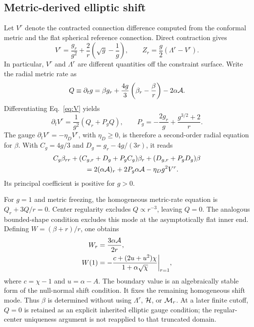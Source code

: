 \subsection{Metric-derived elliptic shift}
Let $V^r$ denote the contracted connection difference computed from the conformal metric and the flat spherical reference connection. Direct contraction gives
\begin{equation}
 V^r=\frac{g_r}{g^2}+\frac{2}{r}\left(\sqrt g-\frac1g\right),
 \qquad Z_r=\frac g2(\Lambda^r-V^r).
\label{eq:V}
\end{equation}
In particular, $V^r$ and $\Lambda^r$ are different quantities off the constraint surface. Write the radial metric rate as
\begin{equation}
 Q\equiv\partial_tg=\beta g_r+\frac{4g}{3}
 \left(\beta_r-\frac\beta r\right)-2\alpha\mathcal A.
\end{equation}
Differentiating Eq.~\eqref{eq:V} yields
\begin{equation}
 \partial_tV^r=\frac{1}{g^2}(Q_r+P_g Q),\qquad
 P_g=-\frac{2g_r}{g}+\frac{g^{3/2}+2}{r}.
\end{equation}
The gauge $\partial_tV^r=-\eta_D V^r$, with $\eta_D\geq0$, is therefore a second-order radial equation for $\beta$. With $C_g=4g/3$ and $D_g=g_r-4g/(3r)$, it reads
\begin{align}
 C_g\beta_{rr}+(C_{g,r}+D_g+P_gC_g)\beta_r
 &+(D_{g,r}+P_gD_g)\beta \nonumber\\
 =2(\alpha\mathcal A)_r+2P_g\alpha\mathcal A&-\eta_Dg^2V^r.
\label{eq:elliptic}
\end{align}
Its principal coefficient is positive for $g>0$.

For $g=1$ and metric freezing, the homogeneous metric-rate equation is $Q_r+3Q/r=0$. Center regularity excludes $Q\propto r^{-3}$, leaving $Q=0$. The analogous bounded-shape condition excludes this mode at the asymptotically flat inner end. Defining $W=(\beta+r)/r$, one obtains
\begin{align}
 W_r&=\frac{3\alpha\mathcal A}{2r},\label{eq:W}\\
 W(1)&=-\frac{c+(2u+u^2)\chi}{1+\alpha\sqrt\chi}\bigg|_{r=1},\nonumber
\end{align}
where $c=\chi-1$ and $u=\alpha-A$.
The boundary value is an algebraically stable form of the null-normal shift condition. It fixes the remaining homogeneous shift mode. Thus $\beta$ is determined without using $\Lambda^r$, $\mathcal H$, or $\mathcal M_r$. At a later finite cutoff, $Q=0$ is retained as an explicit inherited elliptic gauge condition; the regular-center uniqueness argument is not reapplied to that truncated domain.

